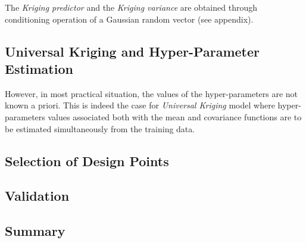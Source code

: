 The \emph{Kriging predictor} and the \emph{Kriging variance} are obtained through conditioning operation of a Gaussian random vector (see appendix).



\subsection{Universal Kriging and Hyper-Parameter Estimation}\label{sub:gp_uk}

However, in most practical situation, the values of the hyper-parameters are not known a priori.
This is indeed the case for \emph{Universal Kriging} model where hyper-parameters values associated both with the mean and covariance functions are to be estimated simultaneously from the training data.





\subsection{Selection of Design Points}\label{sub:gp_design}

\subsection{Validation}\label{sub:gp_validation}

\subsection{Summary}\label{sub:gp_summary}